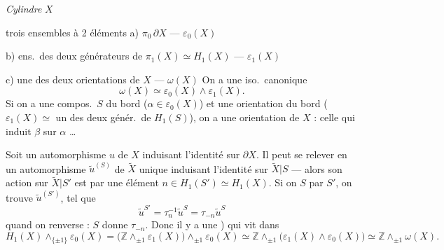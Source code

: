\documentclass[11pt,a4paper]{article}
\begin{document}

\emph{Cylindre} \struck{\ill{}} $X$

trois ensembles à 2 éléments
a) $\pi_0\,\partial X$ — $\varepsilon_0(X)$

b) ens.\ des deux générateurs de $\pi_1(X)\simeq H_1(X)$ — $\varepsilon_1(X)$

c) une des deux orientations de $X$ — $\omega(X)$
On a une iso.\ canonique
\[
\omega(X)\simeq\varepsilon_0(X)\wedge\varepsilon_1(X).
\]
Si on a une compos.\ $S$ du bord ($\alpha\in\varepsilon_0(X)$) et une orientation du bord (\struck{\ill{}} $\varepsilon_1(X)\simeq$ un des deux génér.\ de $H_1(S)$), on a une orientation de $X$ : celle qui induit $\beta$ sur $\alpha$ …

Soit un automorphisme $u$ de $X$ induisant l'identité sur $\partial X$. Il peut se relever en un automorphisme $\tilde u^{(S)}$ de $\widetilde{X}$ unique induisant l'identité sur $\widetilde{X}|S$ — alors son action sur $\widetilde{X}|S'$ est \struck{\ill{}}  par une élément  $n\in H_1(S')\simeq H_1(X)$.
Si on   $S$ par $S'$, on trouve $\tilde u^{(S')}$, tel que
\[
\tilde u^{S'}=\tau_n^{-1}\tilde u^{S}=\tau_{-n}\tilde u^{S}
\]
\struck{\ill{}} quand on renverse : $S$ donne $\tau_{-n}$. Donc il y a une ) qui vit dans
\[
H_1(X)\wedge_{\{\pm1\}}\varepsilon_0(X)=\bigl(\mathbb{Z}\wedge_{\pm1}\varepsilon_1(X)\bigr)\wedge_{\pm1}\varepsilon_0(X)
\simeq\mathbb{Z}\wedge_{\pm1}\bigl(\varepsilon_1(X)\wedge\varepsilon_0(X)\bigr)
\simeq\mathbb{Z}\wedge_{\pm1}\omega(X).
\]
\end{document}

